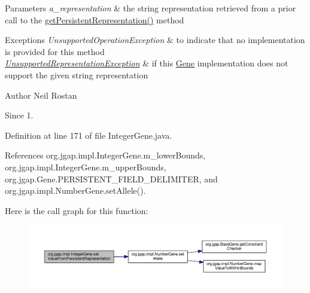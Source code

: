 \begin{DoxyParams}{Parameters}
{\em a\-\_\-representation} & the string representation retrieved from a prior call to the \hyperlink{classorg_1_1jgap_1_1impl_1_1_integer_gene_a81f6bb7889e353d5fe2a191b2fe530bd}{get\-Persistent\-Representation()} method\\
\hline
\end{DoxyParams}

\begin{DoxyExceptions}{Exceptions}
{\em Unsupported\-Operation\-Exception} & to indicate that no implementation is provided for this method \\
\hline
{\em \hyperlink{classorg_1_1jgap_1_1_unsupported_representation_exception}{Unsupported\-Representation\-Exception}} & if this \hyperlink{interfaceorg_1_1jgap_1_1_gene}{Gene} implementation does not support the given string representation\\
\hline
\end{DoxyExceptions}
\begin{DoxyAuthor}{Author}
Neil Rostan 
\end{DoxyAuthor}
\begin{DoxySince}{Since}
1. 
\end{DoxySince}


Definition at line 171 of file Integer\-Gene.\-java.



References org.\-jgap.\-impl.\-Integer\-Gene.\-m\-\_\-lower\-Bounds, org.\-jgap.\-impl.\-Integer\-Gene.\-m\-\_\-upper\-Bounds, org.\-jgap.\-Gene.\-P\-E\-R\-S\-I\-S\-T\-E\-N\-T\-\_\-\-F\-I\-E\-L\-D\-\_\-\-D\-E\-L\-I\-M\-I\-T\-E\-R, and org.\-jgap.\-impl.\-Number\-Gene.\-set\-Allele().



Here is the call graph for this function\-:
\nopagebreak
\begin{figure}[H]
\begin{center}
\leavevmode
\includegraphics[width=350pt]{classorg_1_1jgap_1_1impl_1_1_integer_gene_a68a36ac6573668c924a01c99209dcd14_cgraph}
\end{center}
\end{figure}


